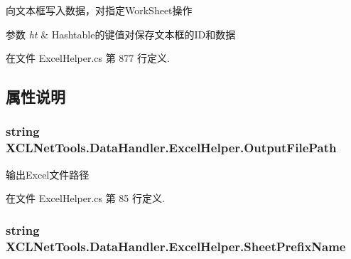 向文本框写入数据，对指定\-Work\-Sheet操作 


\begin{DoxyParams}{参数}
{\em ht} & Hashtable的键值对保存文本框的\-I\-D和数据\\
\hline
\end{DoxyParams}


在文件 Excel\-Helper.\-cs 第 877 行定义.



\subsection{属性说明}
\hypertarget{class_x_c_l_net_tools_1_1_data_handler_1_1_excel_helper_ada3dfa77cf3ac278ee83281f04707aa3}{
\subsubsection[{Output\-File\-Path}]{\setlength{\rightskip}{0pt plus 5cm}string X\-C\-L\-Net\-Tools.\-Data\-Handler.\-Excel\-Helper.\-Output\-File\-Path\hspace{0.3cm}{\ttfamily [set]}}}\label{class_x_c_l_net_tools_1_1_data_handler_1_1_excel_helper_ada3dfa77cf3ac278ee83281f04707aa3}


输出\-Excel文件路径 



在文件 Excel\-Helper.\-cs 第 85 行定义.

\hypertarget{class_x_c_l_net_tools_1_1_data_handler_1_1_excel_helper_a19d5234b9309942b87041f70bef91647}{
\subsubsection[{Sheet\-Prefix\-Name}]{\setlength{\rightskip}{0pt plus 5cm}string X\-C\-L\-Net\-Tools.\-Data\-Handler.\-Excel\-Helper.\-Sheet\-Prefix\-Name\hspace{0.3cm}{\ttfamily [set]}}}\label{class_x_c_l_net_tools_1_1_data_handler_1_1_excel_helper_a19d5234b9309942b87041f70bef91647}


